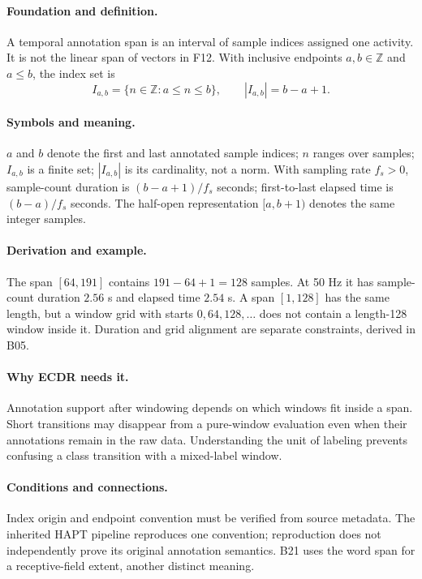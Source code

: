 \paragraph{Foundation and definition.}
A temporal annotation span is an interval of sample indices assigned one
activity. It is not the linear span of vectors in F12. With inclusive
endpoints $a,b\in\mathbb Z$ and $a\le b$, the index set is
\[
 I_{a,b}=\{n\in\mathbb Z:a\le n\le b\},\qquad |I_{a,b}|=b-a+1.
\]
\paragraph{Symbols and meaning.}
$a$ and $b$ denote the first and last annotated sample indices; $n$ ranges
over samples; $I_{a,b}$ is a finite set; $|I_{a,b}|$ is its cardinality,
not a norm. With sampling rate $f_s>0$, sample-count duration is
$(b-a+1)/f_s$ seconds; first-to-last elapsed time is $(b-a)/f_s$ seconds.
The half-open representation $[a,b+1)$ denotes the same integer samples.
\paragraph{Derivation and example.}
The span $[64,191]$ contains $191-64+1=128$ samples. At 50 Hz it has
sample-count duration $2.56$ s and elapsed time $2.54$ s. A span $[1,128]$
has the same length, but a window grid with starts $0,64,128,\ldots$ does
not contain a length-128 window inside it. Duration and grid alignment
are separate constraints, derived in B05.
\paragraph{Why ECDR needs it.}
Annotation support after windowing depends on which windows fit inside a
span. Short transitions may disappear from a pure-window evaluation even
when their annotations remain in the raw data. Understanding the unit of
labeling prevents confusing a class transition with a mixed-label window.
\paragraph{Conditions and connections.}
Index origin and endpoint convention must be verified from source metadata.
The inherited HAPT pipeline reproduces one convention; reproduction does
not independently prove its original annotation semantics. B21 uses the
word span for a receptive-field extent, another distinct meaning.

